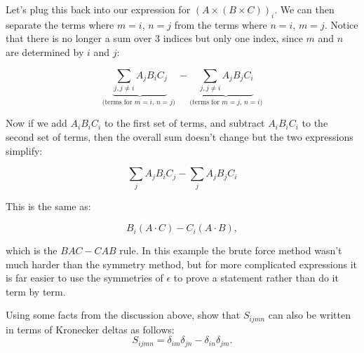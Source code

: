 Let's plug this back into our expression for $ \left( A \times (B \times C) \right)_i$. We can then separate the terms where $m=i$, $n=j$ from the terms where $n=i$, $m=j$. Notice that there is no longer a sum over 3 indices but 
only one index, since $m$ and $n$ are determined by $i$ and $j$:

\[ \underbrace{\sum_{j, j \neq i}  A_j B_i C_j}_{\text{(terms for $m=i$, $n=j$) }}    -  \underbrace{ \sum_{j, j \neq i}   A_j B_j C_i}_{\text{(terms for $m=j$, $n=i$)}} \] 
	                         	  


Now if we add $A_i B_i C_i$ to the first set of terms, and subtract $A_i B_i C_i$ to the second set of terms, then the overall sum doesn't change but the two 
expressions simplify:

\[ \sum_{j}  A_j B_i C_j    -  \sum_{j}   A_j B_j C_i  \]

This is the same as:

\[ B_i  (A \cdot C) - C_i (A \cdot B), \]

which is the $BAC-CAB$ rule.  In this example the brute force method wasn't much harder than the symmetry method, but for more complicated expressions it is far easier to use the symmetries of $\epsilon$ to prove a statement rather than do it term by term.

\begin{exercise}{}
Using some facts from the discussion above, show that  $S_{ijmn}$ can also be written in terms of Kronecker deltas as follows:
\[S_{ijmn} = \delta_{im} \delta_{jn} - \delta_{in} \delta_{jm}. \]
\end{exercise}

